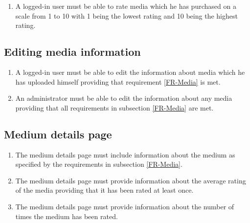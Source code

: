 \documentclass[../report.tex]{subfiles}
\begin{document}
\begin{enumerate}[label=FR-\twodigits*, resume]
	\item A logged-in user must be able to rate media which he has purchased on a scale from 1 to 10 with 1 being the lowest rating and 10 being the highest rating.
\end{enumerate}
		
\subsection{Editing media information}

\begin{enumerate}[label=FR-\twodigits*, resume]
	\item A logged-in user must be able to edit the information about media which he has uploaded himself providing that requirement \ref{FR-Media} is met.
	\item An administrator must be able to edit the information about any media providing that all requirements in subsection \ref{FR-Media} are met.
\end{enumerate}
			
\subsection {Medium details page}

\begin{enumerate}[label=FR-\twodigits*, resume]
	\item The medium details page must include information about the medium as specified by the requirements in subsection \ref{FR-Media}.
	\item The medium details page must provide information about the average rating of the media providing that it has been rated at least once.
	\item The medium details page must provide information about the number of times the medium has been rated.
\end{enumerate}
			
\end{document}
